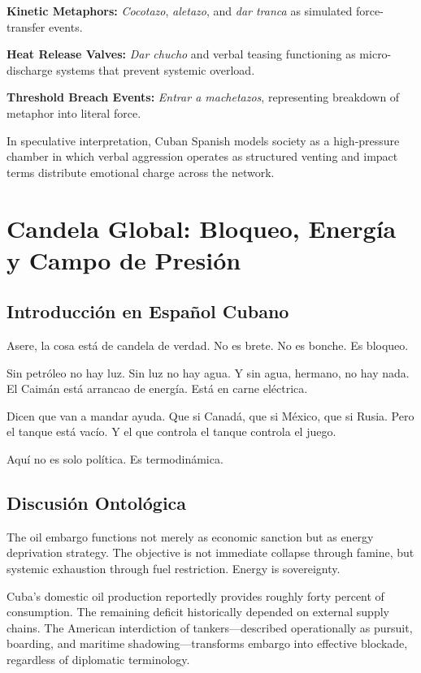 \documentclass[12pt]{article}
\begin{document}
\textbf{Kinetic Metaphors:} \textit{Cocotazo}, \textit{aletazo}, and \textit{dar tranca} as simulated force-transfer events.

\textbf{Heat Release Valves:} \textit{Dar chucho} and verbal teasing functioning as micro-discharge systems that prevent systemic overload.

\textbf{Threshold Breach Events:} \textit{Entrar a machetazos}, representing breakdown of metaphor into literal force.

In speculative interpretation, Cuban Spanish models society as a high-pressure chamber in which verbal aggression operates as structured venting and impact terms distribute emotional charge across the network.

\section{Candela Global: Bloqueo, Energía y Campo de Presión}

\subsection*{Introducción en Español Cubano}

Asere, la cosa está de candela de verdad. No es brete. No es bonche. Es bloqueo.

Sin petróleo no hay luz. Sin luz no hay agua. Y sin agua, hermano, no hay nada. El Caimán está arrancao de energía. Está en carne eléctrica.

Dicen que van a mandar ayuda. Que si Canadá, que si México, que si Rusia. Pero el tanque está vacío. Y el que controla el tanque controla el juego.

Aquí no es solo política. Es termodinámica.

\subsection*{Discusión Ontológica}

The oil embargo functions not merely as economic sanction but as energy deprivation strategy. The objective is not immediate collapse through famine, but systemic exhaustion through fuel restriction. Energy is sovereignty.

Cuba's domestic oil production reportedly provides roughly forty percent of consumption. The remaining deficit historically depended on external supply chains. The American interdiction of tankers---described operationally as pursuit, boarding, and maritime shadowing---transforms embargo into effective blockade, regardless of diplomatic terminology.
\end{document}
